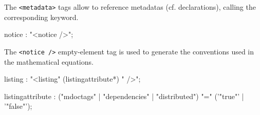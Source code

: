 The \lstinline'<metadata>' tags allow to reference \faust metadatas (cf. declarations), calling the corresponding keyword.


\begin{rail}
notice : "<notice />";
\end{rail}

The \lstinline'<notice />' empty-element tag is used to generate the conventions used in the mathematical equations.
% 

\begin{rail}
listing : "<listing" (listingattribute*) " />";
\end{rail}

\begin{rail}
listingattribute : ("mdoctags" | "dependencies" | "distributed") "=" ('"true"' | '"false"');
\end{rail}


